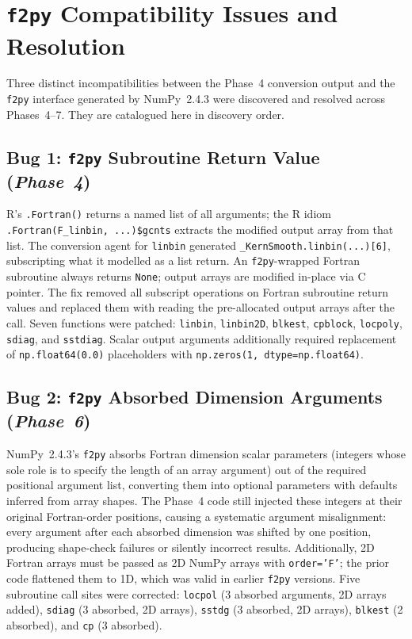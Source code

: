 \documentclass[12pt,a4paper]{article}
\newcommand{\pkg}[1]{\texttt{#1}}
\begin{document}
\section{\pkg{f2py} Compatibility Issues and Resolution}
\label{supp:f2py}

Three distinct incompatibilities between the Phase~4 conversion output and the \pkg{f2py} interface generated by NumPy~2.4.3 were discovered and resolved across Phases~4--7. They are catalogued here in discovery order.

\subsection{Bug 1: \pkg{f2py} Subroutine Return Value (\textit{Phase~4})}

R's \texttt{.Fortran()} returns a named list of all arguments; the R idiom \texttt{.Fortran(F\_linbin,~...)\$gcnts} extracts the modified output array from that list. The conversion agent for \texttt{linbin} generated \texttt{\_KernSmooth.linbin(...)[6]}, subscripting what it modelled as a list return. An \pkg{f2py}-wrapped Fortran subroutine always returns \texttt{None}; output arrays are modified in-place via C pointer. The fix removed all subscript operations on Fortran subroutine return values and replaced them with reading the pre-allocated output arrays after the call. Seven functions were patched: \texttt{linbin}, \texttt{linbin2D}, \texttt{blkest}, \texttt{cpblock}, \texttt{locpoly}, \texttt{sdiag}, and \texttt{sstdiag}. Scalar output arguments additionally required replacement of \texttt{np.float64(0.0)} placeholders with \texttt{np.zeros(1, dtype=np.float64)}.

\subsection{Bug 2: \pkg{f2py} Absorbed Dimension Arguments (\textit{Phase~6})}

NumPy~2.4.3's \pkg{f2py} absorbs Fortran dimension scalar parameters (integers whose sole role is to specify the length of an array argument) out of the required positional argument list, converting them into optional parameters with defaults inferred from array shapes. The Phase~4 code still injected these integers at their original Fortran-order positions, causing a systematic argument misalignment: every argument after each absorbed dimension was shifted by one position, producing shape-check failures or silently incorrect results. Additionally, 2D Fortran arrays must be passed as 2D NumPy arrays with \texttt{order='F'}; the prior code flattened them to 1D, which was valid in earlier \pkg{f2py} versions. Five subroutine call sites were corrected: \texttt{locpol} (3 absorbed arguments, 2D arrays added), \texttt{sdiag} (3 absorbed, 2D arrays), \texttt{sstdg} (3 absorbed, 2D arrays), \texttt{blkest} (2 absorbed), and \texttt{cp} (3 absorbed).
\end{document}
